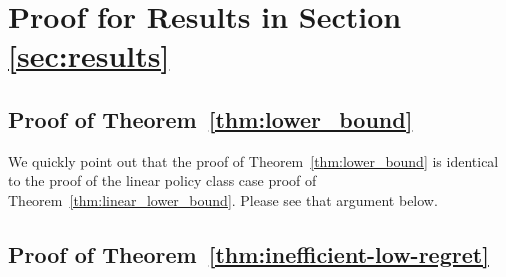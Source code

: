 \documentclass{article}
\newcommand{\kevin}[1]{\textcolor{red}{KGJ:#1}}
\newcommand{\1}{\mathbf{1}}
\begin{document}
\section{Proof for Results in Section \ref{sec:results}}
\subsection{Proof of Theorem~\ref{thm:lower_bound}}
We quickly point out that the proof of Theorem~\ref{thm:lower_bound} is identical to the proof of the linear policy class case proof of Theorem~\ref{thm:linear_lower_bound}. Please see that argument below.

\subsection{Proof of Theorem~\ref{thm:inefficient-low-regret}}
\end{document}
